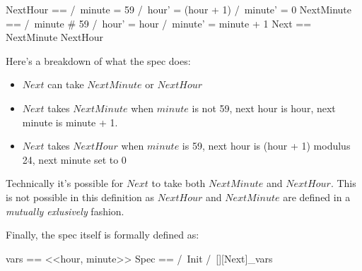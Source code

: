 \documentclass{report}
\begin{document}
\begin{tla}
    NextHour ==
        /\ minute = 59 
        /\ hour' = (hour + 1) %
        /\ minute' = 0
    NextMinute == 
        /\ minute # 59
        /\ hour' = hour 
        /\ minute' = minute + 1 
    Next ==
        \/ NextMinute
        \/ NextHour
\end{tla}
\begin{tlatex}
%
%
%
%
%
%
%
%
%
%
%
\end{tlatex}
 \newline

Here's a breakdown of what the spec does:
\begin{itemize}
    \item $Next$ can take $NextMinute$ or $NextHour$
    \item $Next$ takes $NextMinute$ when $minute$ is not 59, next hour is hour, next minute is minute + 1. 
    \item $Next$ takes $NextHour$ when $minute$ is 59, next hour is (hour + 1) modulus 24, next minute set to 0
\end{itemize}

Technically it's possible for $Next$ to take both $NextMinute$ and $NextHour$.
This is not possible in this definition as $NextHour$ and $NextMinute$ are
defined in a \textit{mutually exlusively} fashion.\newline

Finally, the spec itself is formally defined as:\newline
\begin{tla}
    vars == <<hour, minute>>
    Spec ==
        /\ Init
        /\ [][Next]_vars
\end{tla}
\begin{tlatex}
%
%
%
%
\end{tlatex}
\newline
\end{document}
